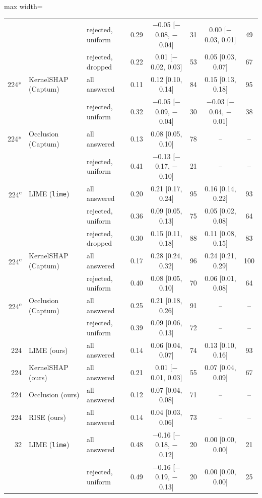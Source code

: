\begin{table}
\begin{adjustbox}{max width=\textheight}
\begin{tabular}{rllccccc}
 &  & rejected, uniform & 0.29 & $-$0.05 {[}$-$0.08, $-$0.04{]} & 31 & 0.00 {[}$-$0.03, 0.01{]} & 49 \\
 &  & rejected, dropped & 0.22 & 0.01 {[}$-$0.02, 0.03{]} & 53 & 0.05 {[}0.03, 0.07{]} & 67 \\
224* & KernelSHAP (Captum) & all answered & 0.11 & 0.12 {[}0.10, 0.14{]} & 84 & 0.15 {[}0.13, 0.18{]} & 95 \\
 &  & rejected, uniform & 0.32 & $-$0.05 {[}$-$0.09, $-$0.04{]} & 30 & $-$0.03 {[}$-$0.04, $-$0.01{]} & 38 \\
224* & Occlusion (Captum) & all answered & 0.13 & 0.08 {[}0.05, 0.10{]} & 78 & -- & -- \\
 &  & rejected, uniform & 0.41 & $-$0.13 {[}$-$0.17, $-$0.10{]} & 21 & -- & -- \\[2pt]
224\textsuperscript{c} & LIME (\texttt{lime}) & all answered & 0.20 & 0.21 {[}0.17, 0.24{]} & 95 & 0.16 {[}0.14, 0.22{]} & 93 \\
 &  & rejected, uniform & 0.36 & 0.09 {[}0.05, 0.13{]} & 75 & 0.05 {[}0.02, 0.08{]} & 64 \\
 &  & rejected, dropped & 0.30 & 0.15 {[}0.11, 0.18{]} & 88 & 0.11 {[}0.08, 0.15{]} & 83 \\
224\textsuperscript{c} & KernelSHAP (Captum) & all answered & 0.17 & 0.28 {[}0.24, 0.32{]} & 96 & 0.24 {[}0.21, 0.29{]} & 100 \\
 &  & rejected, uniform & 0.40 & 0.08 {[}0.05, 0.10{]} & 70 & 0.06 {[}0.01, 0.08{]} & 64 \\
224\textsuperscript{c} & Occlusion (Captum) & all answered & 0.25 & 0.21 {[}0.18, 0.26{]} & 91 & -- & -- \\
 &  & rejected, uniform & 0.39 & 0.09 {[}0.06, 0.13{]} & 72 & -- & -- \\[2pt]
224 & LIME (ours) & all answered & 0.14 & 0.06 {[}0.04, 0.07{]} & 74 & 0.13 {[}0.10, 0.16{]} & 93 \\
224 & KernelSHAP (ours) & all answered & 0.21 & 0.01 {[}$-$0.01, 0.03{]} & 55 & 0.07 {[}0.04, 0.09{]} & 67 \\
224 & Occlusion (ours) & all answered & 0.12 & 0.07 {[}0.04, 0.08{]} & 71 & -- & -- \\
224 & RISE (ours) & all answered & 0.14 & 0.04 {[}0.03, 0.06{]} & 73 & -- & -- \\[2pt]
32 & LIME (\texttt{lime}) & all answered & 0.48 & $-$0.16 {[}$-$0.18, $-$0.12{]} & 20 & 0.00 {[}0.00, 0.00{]} & 21 \\
 &  & rejected, uniform & 0.49 & $-$0.16 {[}$-$0.19, $-$0.13{]} & 20 & 0.00 {[}0.00, 0.00{]} & 25 \\

\end{tabular}
\end{adjustbox}
\end{table}
